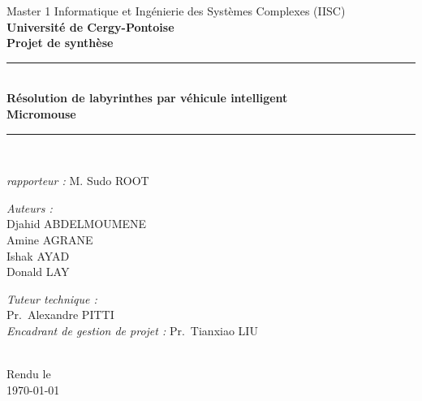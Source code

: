 \begin{titlepage}

\begin{center}

\AddToShipoutPicture*{\BackgroundPic}

{\large Master 1 Informatique et Ingénierie des Systèmes Complexes (IISC)}\\[0.5cm]

{\large \textbf{Université de Cergy-Pontoise}}\\[1.5cm]

{\large \textbf{Projet de synthèse}}\\[0.5cm]

\rule{\linewidth}{0.5mm} \\[0.4cm]
{ 
    \huge \bfseries Résolution de labyrinthes par véhicule intelligent \\[0.5cm]
    \huge Micromouse\\[0.4cm]
}
\rule{\linewidth}{0.5mm} \\[0.5cm]

\begin{center}
\begin{minipage}{0.5\textwidth}
   \large
    \emph{rapporteur :}
    M. Sudo \textsc{ROOT}
\end{minipage}%
\end{center}

\vspace{5mm}
\noindent
\begin{minipage}{0.5\textwidth}
  \begin{flushleft} \large
    \emph{Auteurs :}\\
    Djahid \textsc{ABDELMOUMENE}\\
    Amine \textsc{AGRANE}\\
    Ishak \textsc{AYAD}\\
    Donald \textsc{LAY}
  \end{flushleft}
\end{minipage}%
\begin{minipage}{0.5\textwidth}
  \begin{flushright} \large
    \emph{Tuteur technique :} \\
    Pr.~Alexandre \textsc{PITTI}\\
    \emph{Encadrant de gestion de projet :}
    Pr.~Tianxiao \textsc{LIU}
  \end{flushright}
\end{minipage}

 \\

\vspace*{\fill}
{\large Rendu le\\ \today}

\end{center}
\end{titlepage}
